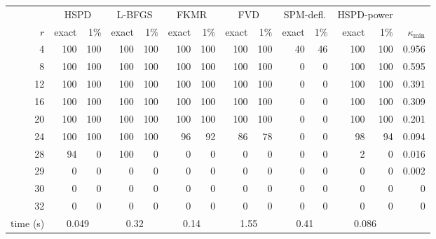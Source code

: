 \begin{tabular}{r rr rr rr rr rr rr r}
\toprule
 & \multicolumn{2}{c}{HSPD} & \multicolumn{2}{c}{L-BFGS} & \multicolumn{2}{c}{FKMR} & \multicolumn{2}{c}{FVD} & \multicolumn{2}{c}{SPM-defl.} & \multicolumn{2}{c}{HSPD-power} & \\
\cmidrule(lr){2-3} \cmidrule(lr){4-5} \cmidrule(lr){6-7} \cmidrule(lr){8-9} \cmidrule(lr){10-11} \cmidrule(lr){12-13}
$r$ & exact & 1\% & exact & 1\% & exact & 1\% & exact & 1\% & exact & 1\% & exact & 1\% & $\kappa_{\min}$\\
\midrule
4 & 100 & 100 & 100 & 100 & 100 & 100 & 100 & 100 & 40 & 46 & 100 & 100 & 0.956 \\
8 & 100 & 100 & 100 & 100 & 100 & 100 & 100 & 100 & 0 & 0 & 100 & 100 & 0.595 \\
12 & 100 & 100 & 100 & 100 & 100 & 100 & 100 & 100 & 0 & 0 & 100 & 100 & 0.391 \\
16 & 100 & 100 & 100 & 100 & 100 & 100 & 100 & 100 & 0 & 0 & 100 & 100 & 0.309 \\
20 & 100 & 100 & 100 & 100 & 100 & 100 & 100 & 100 & 0 & 0 & 100 & 100 & 0.201 \\
24 & 100 & 100 & 100 & 100 & 96 & 92 & 86 & 78 & 0 & 0 & 98 & 94 & 0.094 \\
28 & 94 & 0 & 100 & 0 & 0 & 0 & 0 & 0 & 0 & 0 & 2 & 0 & 0.016 \\
29 & 0 & 0 & 0 & 0 & 0 & 0 & 0 & 0 & 0 & 0 & 0 & 0 & 0.002 \\
30 & 0 & 0 & 0 & 0 & 0 & 0 & 0 & 0 & 0 & 0 & 0 & 0 & 0 \\
32 & 0 & 0 & 0 & 0 & 0 & 0 & 0 & 0 & 0 & 0 & 0 & 0 & 0 \\
\midrule
time (s) & \multicolumn{2}{c}{0.049} & \multicolumn{2}{c}{0.32} & \multicolumn{2}{c}{0.14} & \multicolumn{2}{c}{1.55} & \multicolumn{2}{c}{0.41} & \multicolumn{2}{c}{0.086} & \\
\bottomrule
\end{tabular}
